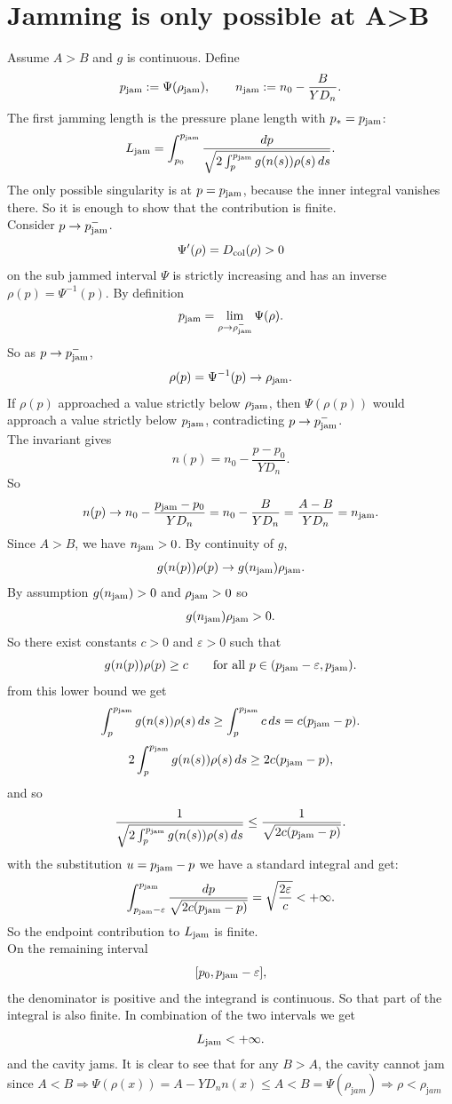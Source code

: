 \documentclass[11pt,a4paper]{report}
\begin{document}
		\section{Jamming is only possible at A>B}
	\label{sec:Ljam_finite}
	Assume $A>B$ and $g$ is continuous.  Define
	\[
	p_{\rm jam}:=\Psi(\rho_{\rm jam}),
	\qquad
	n_{\rm jam}:=n_0-\frac{B}{YD_n}.
	\]
	The first jamming length is the pressure plane length with
	$p_*=p_{\rm jam}$:
	\[
	L_{\rm jam}
	=
	\int_{p_0}^{p_{\rm jam}}
	\frac{dp}
	{
		\sqrt{
			2\int_p^{p_{\rm jam}}g(n(s))\rho(s)\,ds
		}
	}.
	\label{eq:Ljam_proof_start_rewritten}
	\]
	The only possible singularity is at $p=p_{\rm jam}$, because the inner
	integral vanishes there.  So it is enough to show that the
	contribution is finite.\\	
	Consider $p\to p_{\rm jam}^{-}$.
	\[
	\Psi'(\rho)=D_{\rm col}(\rho)>0
	\]
	on the sub jammed interval $\Psi$ is strictly increasing and has an
	inverse $\rho(p)=\Psi^{-1}(p)$.  By definition
	\[
	p_{\rm jam}
	=
	\lim_{\rho\to\rho_{\rm jam}^{-}}\Psi(\rho).
	\]
	So as $p\to p_{\rm jam}^{-}$,
	\[
	\rho(p)=\Psi^{-1}(p)\to\rho_{\rm jam}.
	\]
	If $\rho(p)$ approached a value strictly below
	$\rho_{\rm jam}$, then $\Psi(\rho(p))$ would approach a value strictly
	below $p_{\rm jam}$, contradicting $p\to p_{\rm jam}^{-}$.\\	
	The invariant gives
	\[
	n(p)=n_0-\frac{p-p_0}{YD_n}.
	\]
	So
	\[
	n(p)\to
	n_0-\frac{p_{\rm jam}-p_0}{YD_n}
	=
	n_0-\frac{B}{YD_n}
	=
	\frac{A-B}{YD_n}
	=
	n_{\rm jam}.
	\]
	Since $A>B$, we have $n_{\rm jam}>0$.  By continuity of $g$,
	\[
	g(n(p))\rho(p)
	\to
	g(n_{\rm jam})\rho_{\rm jam}.
	\]
	By assumption $g(n_{\rm jam})>0$ and $\rho_{\rm jam}>0$ so
	\[
	g(n_{\rm jam})\rho_{\rm jam}>0.
	\]
	So there exist constants $c>0$ and $\varepsilon>0$ such that
	\[
	g(n(p))\rho(p)\ge c
	\qquad
	\text{for all }
	p\in(p_{\rm jam}-\varepsilon,p_{\rm jam}).
	\]	
	from this lower bound we get
	\[
	\int_p^{p_{\rm jam}}g(n(s))\rho(s)\,ds
	\ge
	\int_p^{p_{\rm jam}} c\,ds
	=
	c(p_{\rm jam}-p).
	\]
	\[
	2\int_p^{p_{\rm jam}}g(n(s))\rho(s)\,ds
	\ge
	2c(p_{\rm jam}-p),
	\]
	and so
	\[
	\frac{1}
	{
		\sqrt{
			2\int_p^{p_{\rm jam}}g(n(s))\rho(s)\,ds
		}
	}
	\le
	\frac{1}{\sqrt{2c(p_{\rm jam}-p)}}.
	\]
	with the substitution $u=p_{\rm jam}-p$ we have a standard integral and get:
	\[
	\int_{p_{\rm jam}-\varepsilon}^{p_{\rm jam}}
	\frac{dp}{\sqrt{2c(p_{\rm jam}-p)}}
	=
	\sqrt{\frac{2\varepsilon}{c}}
	<+\infty.
	\]
	So the endpoint contribution to $L_{\rm jam}$ is finite.\\	
	On the remaining interval
	\[
	[p_0,p_{\rm jam}-\varepsilon],
	\]
	the denominator is positive and the
	integrand is continuous. So that part of the integral is also finite.
	In combination of the two intervals we get
	\[
	L_{\rm jam}<+\infty.
	\] and the cavity jams. It is clear to see that for any $B>A$, the cavity cannot jam since $A<B\Rightarrow\Psi(\rho(x))=A-YD_nn(x)\le A<B=\Psi(\rho_{\mathrm jam})\Rightarrow\rho<\rho_{\mathrm jam}$ 
\end{document}
